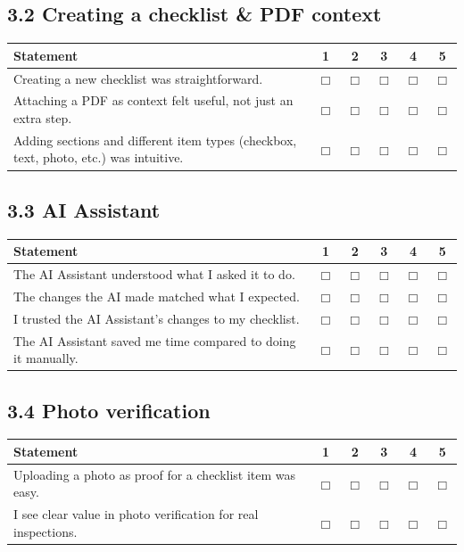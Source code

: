 \documentclass[11pt,a4paper]{article}
\begin{document}
\subsection*{3.2 Creating a checklist \& PDF context}

\begin{tabularx}{\textwidth}{@{}YCCCCC@{}}
\toprule
Statement & 1 & 2 & 3 & 4 & 5\\
\midrule
Creating a new checklist was straightforward. & $\Box$ & $\Box$ & $\Box$ & $\Box$ & $\Box$\\
Attaching a PDF as context felt useful, not just an extra step. & $\Box$ & $\Box$ & $\Box$ & $\Box$ & $\Box$\\
Adding sections and different item types (checkbox, text, photo, etc.) was intuitive. & $\Box$ & $\Box$ & $\Box$ & $\Box$ & $\Box$\\
\bottomrule
\end{tabularx}

\subsection*{3.3 AI Assistant}

\begin{tabularx}{\textwidth}{@{}YCCCCC@{}}
\toprule
Statement & 1 & 2 & 3 & 4 & 5\\
\midrule
The AI Assistant understood what I asked it to do. & $\Box$ & $\Box$ & $\Box$ & $\Box$ & $\Box$\\
The changes the AI made matched what I expected. & $\Box$ & $\Box$ & $\Box$ & $\Box$ & $\Box$\\
I trusted the AI Assistant's changes to my checklist. & $\Box$ & $\Box$ & $\Box$ & $\Box$ & $\Box$\\
The AI Assistant saved me time compared to doing it manually. & $\Box$ & $\Box$ & $\Box$ & $\Box$ & $\Box$\\
\bottomrule
\end{tabularx}

\subsection*{3.4 Photo verification}

\begin{tabularx}{\textwidth}{@{}YCCCCC@{}}
\toprule
Statement & 1 & 2 & 3 & 4 & 5\\
\midrule
Uploading a photo as proof for a checklist item was easy. & $\Box$ & $\Box$ & $\Box$ & $\Box$ & $\Box$\\
I see clear value in photo verification for real inspections. & $\Box$ & $\Box$ & $\Box$ & $\Box$ & $\Box$\\
\bottomrule
\end{tabularx}
\end{document}
